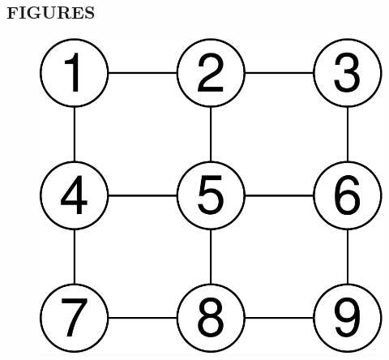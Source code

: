 \documentclass[11pt, titlepage]{article}\usepackage[]{graphicx}\usepackage[]{color}
\begin{document}
\begin{spacing}{1.9}
\begin{flushleft}
\newpage

\section*{FIGURES}



\begin{figure}[H]
  \begin{center}
  \includegraphics[width=\linewidth]{Fig-3x3Graph}
  \end{center}
  \caption{  \label{Fig-3x3Graph}}         
\end{figure} 





\end{flushleft}
\end{spacing}
\end{document}
